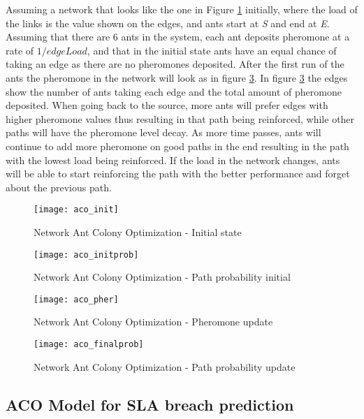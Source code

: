 Assuming a network that looks like the one in Figure \ref{fig:aco_init} initially, where the load of the links is the value shown on the edges, and ants start at \textit{S} and end at \textit{E}. Assuming that there are 6 ants in the system, each ant deposits pheromone at a rate of $1/edgeLoad$, and that in the initial state ants have an equal chance of taking an edge as there are no pheromones deposited. After the first run of the ants the pheromone in the network will look as in figure \ref{fig:aco_pher}. In figure \ref{fig:aco_pher} the edges show the number of ants taking each edge and the total amount of pheromone deposited. When going back to the source, more ants will prefer edges with higher pheromone values thus resulting in that path being reinforced, while other paths will have the pheromone level decay. As more time passes, ants will continue to add more pheromone on good paths in the end resulting in the path with the lowest load being reinforced. If the load in the network changes, ants will be able to start reinforcing the path with the better performance and forget about the previous path.

\begin{figure}
	\centering
	\texttt{[image: aco\_init]}
	\caption{Network Ant Colony Optimization - Initial state}
	\label{fig:aco_init}
\end{figure}

\begin{figure}
	\centering
	\texttt{[image: aco\_initprob]}
	\caption{Network Ant Colony Optimization - Path probability initial}
	\label{fig:aco_initprob}
\end{figure}

\begin{figure}
	\centering
	\texttt{[image: aco\_pher]}
	\caption{Network Ant Colony Optimization - Pheromone update}
	\label{fig:aco_pher}
\end{figure}

\begin{figure}
	\centering
	\texttt{[image: aco\_finalprob]}
	\caption{Network Ant Colony Optimization - Path probability update}
	\label{fig:aco_finalprob}
\end{figure}

\subsection{ACO Model for SLA breach prediction}

